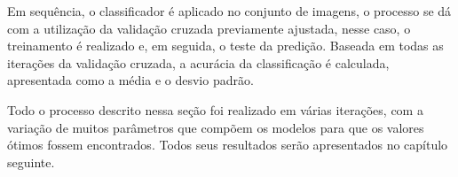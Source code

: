 Em sequência, o classificador é aplicado no conjunto de imagens, o processo se dá com a utilização da validação cruzada previamente ajustada, nesse caso, o treinamento é realizado e, em seguida, o teste da predição. Baseada em todas as iterações da validação cruzada, a acurácia da classificação é calculada, apresentada como a média e o desvio padrão.


Todo o processo descrito nessa seção foi realizado em várias iterações, com a variação de muitos parâmetros que compõem os modelos para que os valores ótimos fossem encontrados. Todos seus resultados serão apresentados no capítulo seguinte.







